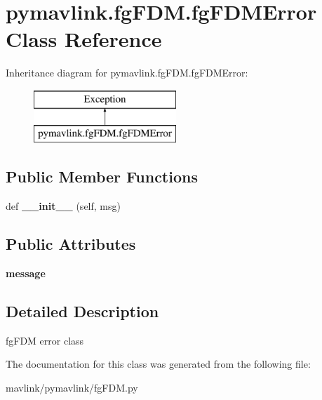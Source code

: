 \hypertarget{classpymavlink_1_1fgFDM_1_1fgFDMError}{}\section{pymavlink.\+fg\+F\+D\+M.\+fg\+F\+D\+M\+Error Class Reference}
\label{classpymavlink_1_1fgFDM_1_1fgFDMError}
Inheritance diagram for pymavlink.\+fg\+F\+D\+M.\+fg\+F\+D\+M\+Error\+:\begin{figure}[H]
\begin{center}
\leavevmode
\includegraphics[height=2.000000cm]{classpymavlink_1_1fgFDM_1_1fgFDMError}
\end{center}
\end{figure}
\subsection*{Public Member Functions}
\begin{DoxyCompactItemize}
\item 
\mbox{\label{classpymavlink_1_1fgFDM_1_1fgFDMError_aa043a6d539a9fbe255bb48dc1c80fc42}} 
def {\bfseries \+\_\+\+\_\+init\+\_\+\+\_\+} (self, msg)
\end{DoxyCompactItemize}
\subsection*{Public Attributes}
\begin{DoxyCompactItemize}
\item 
\mbox{\label{classpymavlink_1_1fgFDM_1_1fgFDMError_aeab57dd000a7c9c7848444bc5c3c9392}} 
{\bfseries message}
\end{DoxyCompactItemize}


\subsection{Detailed Description}
\begin{DoxyVerb}fgFDM error class\end{DoxyVerb}
 

The documentation for this class was generated from the following file\+:\begin{DoxyCompactItemize}
\item 
mavlink/pymavlink/fg\+F\+D\+M.\+py\end{DoxyCompactItemize}
